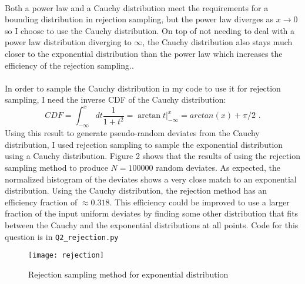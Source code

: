 \documentclass{article}
\newcommand{\<}[1]{\left\langle #1 \right\rangle }
\begin{document}
\\
Both a power law and a Cauchy distribution meet the requirements for a bounding distribution in rejection sampling, but the power law diverges as $x\to 0$ so I choose to use the Cauchy distribution. On top of not needing to deal with a power law distribution diverging to $\infty$, the Cauchy distribution also stays much closer to the exponential distribution than the power law which increases the efficiency of the rejection sampling..\\
\\
In order to sample the Cauchy distribution in my code to use it for rejection sampling, I need the inverse CDF of the Cauchy distribution:
\[CDF = \int_{-\infty}^x dt \frac{1}{1+t^2} = \arctan{t}\bigg|_{-\infty}^x = arctan(x) + \pi/2 \text{ .}\]
Using this result to generate pseudo-random deviates from the Cauchy distribution, I used rejection sampling to sample the exponential distribution using a Cauchy distribution. Figure 2 shows that the results of using the rejection sampling method to produce $N=100000$ random deviates. As expected, the normalized histogram of the deviates shows a very close match to an exponential distribution. Using the Cauchy distribution, the rejection method has an efficiency fraction  of $\approx 0.318$. This efficiency could be improved to use a larger fraction of the input uniform deviates by finding some other distribution that fits between the Cauchy and the exponential distributions at all points. Code for this question is in \texttt{Q2\_rejection.py}
\begin{figure}[h]
	\caption{Rejection sampling method for exponential distribution}
	\centering
	\texttt{[image: rejection]}
\end{figure}
\end{document}

